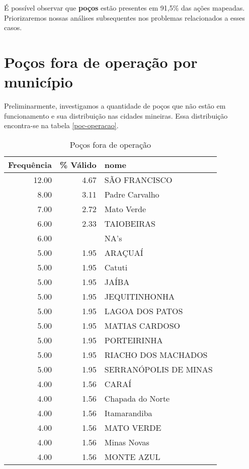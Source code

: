 \documentclass[a4paper, 12pt, openright, oneside, english, brazil, article]{abntex2}
\begin{document}
	É possível observar que \textbf{poços} estão presentes em 91,5\% das ações mapeadas. Priorizaremos nossas análises subsequentes nos problemas relacionados a esses casos.

	\section{Poços fora de operação por município}
	
	Preliminarmente, investigamos a quantidade de poços que não estão em funcionamento e sua distribuição nas cidades mineiras. Essa distribuição encontra-se na tabela \ref{poc-operacao}.
	
	\begin{scriptsize}
	\begin{longtable}{rrl}
		\caption{Poços fora de operação} \\ 
		\hline
		Frequência & \% Válido & nome \\ 
		\hline
		12.00 & 4.67 & SÃO FRANCISCO \\ 
		8.00 & 3.11 & Padre Carvalho \\ 
		7.00 & 2.72 & Mato Verde \\ 
		6.00 & 2.33 & TAIOBEIRAS \\ 
		6.00 &  & NA's \\ 
		5.00 & 1.95 & ARAÇUAÍ \\ 
		5.00 & 1.95 & Catuti \\ 
		5.00 & 1.95 & JAÍBA \\ 
		5.00 & 1.95 & JEQUITINHONHA \\ 
		5.00 & 1.95 & LAGOA DOS PATOS \\ 
		5.00 & 1.95 & MATIAS CARDOSO \\ 
		5.00 & 1.95 & PORTEIRINHA \\ 
		5.00 & 1.95 & RIACHO DOS MACHADOS \\ 
		5.00 & 1.95 & SERRANÓPOLIS DE MINAS \\ 
		4.00 & 1.56 & CARAÍ \\ 
		4.00 & 1.56 & Chapada do Norte \\ 
		4.00 & 1.56 & Itamarandiba \\ 
		4.00 & 1.56 & MATO VERDE \\ 
		4.00 & 1.56 & Minas Novas \\ 
		4.00 & 1.56 & MONTE AZUL \\ 

\end{longtable}
\end{scriptsize}
\end{document}

